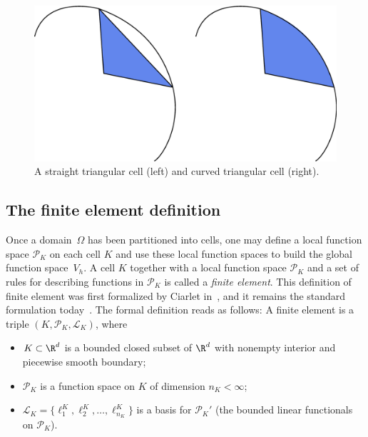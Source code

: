 \begin{figure}
  \begin{center}
    \includegraphics[width=\largewidth]{chapters/kirby-7/eps/straight_and_curved_triangles.eps}
    \caption{A straight triangular cell (left) and curved triangular
      cell (right).}
    \label{fig:shapes,curved}
  \end{center}
\end{figure}

\subsection{The finite element definition}

Once a domain~$\Omega$ has been partitioned into cells, one may define
a local function space $\mathcal{P}_K$ on each cell $K$ and use these
local function spaces to build the global function space~$V_h$. A cell
$K$ together with a local function space $\mathcal{P}_K$ and a set of
rules for describing functions in $\mathcal{P}_K$ is called a
\emph{finite element}. This definition of finite element was first
formalized by Ciarlet in~\citet{Ciarlet1978,Ciarlet2002}, and it
remains the standard formulation
today~\cite{BrennerScott1994,BrennerScott2008}. The formal definition
reads as follows: A finite element is a triple $(K, \mathcal{P}_K,
\mathcal{L}_K)$, where
\begin{itemize}
\item
  $K \subset \R^d$ is a bounded closed subset of $\R^d$ with nonempty
  interior and piecewise smooth boundary;
\item
  $\mathcal{P}_K$ is a function space on $K$ of dimension $n_K < \infty$;
\item
  $\mathcal{L}_K = \{\ell^K_1, \ell^K_2, \ldots, \ell^K_{n_K}\}$ is a
  basis for $\mathcal{P}_K'$ (the bounded linear functionals on
  $\mathcal{P}_K$).
\end{itemize}

